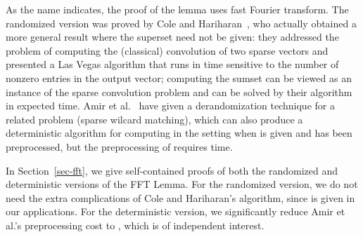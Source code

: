 \documentclass[11pt]{article}
\newcommand{\LONG}[1]{#1}\newcommand{\SHORT}[1]{}
\newcommand{\IGNORE}[1]{}
\begin{document}
As the name indicates, the proof of the lemma uses fast Fourier transform. The randomized version
was proved by Cole and Hariharan~\cite{CH02}, who
actually obtained a more general result where the superset 
need not be given: they addressed the problem
of computing the (classical) convolution of two sparse vectors and
presented a Las Vegas algorithm that runs in time sensitive to the
number of nonzero entries in the output vector; computing
the sumset  can be viewed as an instance of the
sparse convolution problem and can be solved by their algorithm
in  expected time.
Amir et al.~\cite{AKP07} have given a derandomization technique
for a related problem (sparse wilcard matching), which can also
produce a deterministic algorithm for computing 
in the setting when  is given and has been preprocessed, but the preprocessing of  requires  time.

In \LONG{Section~\ref{sec-fft}}\SHORT{the full paper},
we give self-contained proofs of both the randomized
and deterministic versions of the FFT Lemma.  For the randomized
version, we do not need the extra complications of Cole and
Hariharan's algorithm, since  is given in our applications.
For the deterministic version, we significantly reduce
Amir et al.'s preprocessing cost to , which is
of independent interest.

\IGNORE{
\noindent
{\bf Proof outline:}

First we can replace  with , by mapping
   to  for a sufficiently large .

  Use a small number of "nearly additive" hash functions
  
  (e.g.,  for some random prime , or
  the hash function from the Baran-Demaine-Patrascu 3SUM paper). NEEDS MORE WORK.

  For each , multiply the polynomials
   and  with a sparse convolution.

  A sparse convolution is a convolution whose input has a high number of zero values. Hence, the input is represented as a list of the non-zero values, and its size  = the number of non-zero values. The size of the (non-zero) output is denoted by . Cole and Hariharan~\cite{CH02} claimed a randomized algorithm that runs in time  yielding the desired.

  In Section~\ref{determinstic-algo} we show our claim for the deterministic case. We point out that a weaker deterministic result that runs in  time~\cite{AKP07} existed previously. AMIR-PORAT DO NOT REALLY NEED T, IS IT COMPARABLE?
  \qed

}
\end{document}
